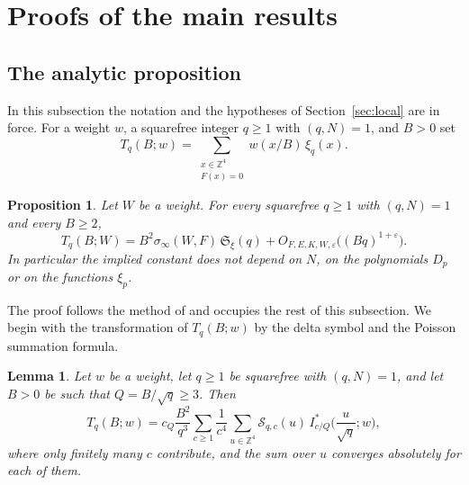 \documentclass[11pt]{amsart}
\numberwithin{equation}{section}
\numberwithin{figure}{section}
\newtheorem{lemma}{Lemma}[section]
\newtheorem{proposition}{Proposition}[section]
\theoremstyle{definition}
\newcommand{\Z}{\mathbb{Z}}
\newcommand{\F}{\mathcal{F}}
\renewcommand{\S}{\mathfrak{S}}
\newcommand{\eps}{\varepsilon}
\begin{document}
\section{Proofs of the main results}\label{sec:proofs}

\subsection{The analytic proposition}\label{sec:analytic}

In this subsection the notation and the hypotheses of
Section~\ref{sec:local} are in force. For a weight $w$, a squarefree
integer $q\ge1$ with $(q,N)=1$, and $B>0$ set
\begin{equation}\label{eq:Tw}
 T_q(B;w)=\sum_{\substack{x\in\Z^4\\F(x)=0}}w(x/B)\,\xi_q(x).
\end{equation}

\begin{proposition}\label{prop:analytic}
Let $W$ be a weight. For every squarefree $q\ge1$ with $(q,N)=1$ and
every $B\ge2$,
\begin{equation}\label{eq:analytic}
 T_q(B;W)=B^2\sigma_\infty(W,F)\,\S_\xi(q)
 +O_{F,E,K,W,\eps}\big((Bq)^{1+\eps}\big).
\end{equation}
In particular the implied constant does not depend on $N$, on the
polynomials $D_p$ or on the functions $\xi_p$.
\end{proposition}

The proof follows the method of \cite{HB} and occupies the rest of
this subsection. We begin with the transformation of $T_q(B;w)$ by
the delta symbol and the Poisson summation formula.

\begin{lemma}\label{lem:poisson}
Let $w$ be a weight, let $q\ge1$ be squarefree with $(q,N)=1$, and
let $B>0$ be such that $Q=B/\sqrt q\ge3$. Then
\begin{equation}\label{eq:poisson}
 T_q(B;w)=c_Q\frac{B^2}{q^3}\sum_{c\ge1}\frac1{c^4}\sum_{u\in\Z^4}
 \mathcal S_{q,c}(u)\,I_{c/Q}^*\Big(\frac u{\sqrt q};w\Big),
\end{equation}
where only finitely many $c$ contribute, and the sum over $u$
converges absolutely for each of them.
\end{lemma}
\end{document}
